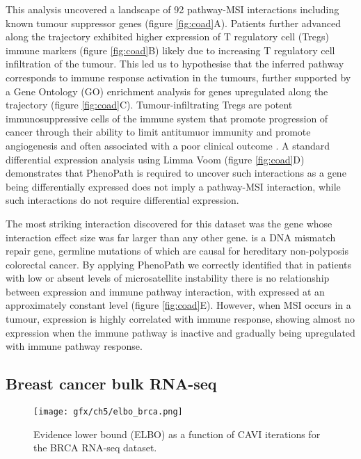 This analysis uncovered a landscape of 92 pathway-MSI interactions including known tumour suppressor genes (figure \ref{fig:coad}A).
Patients further advanced along the trajectory exhibited higher expression of T regulatory cell (Tregs) immune markers (figure \ref{fig:coad}B) likely due to increasing T regulatory cell infiltration of the tumour.
This led us to hypothesise that the inferred pathway corresponds to immune response activation in the tumours, further supported by a Gene Ontology (GO) enrichment analysis for genes upregulated along the trajectory   (figure \ref{fig:coad}C).
Tumour-infiltrating Tregs are potent immunosuppressive cells of the immune system that promote progression of cancer through their ability to limit antitumuor immunity and promote angiogenesis and often associated with a poor clinical outcome \cite{facciabene2012t}.
A standard differential expression analysis using Limma Voom \cite{Law2014-tu} (figure \ref{fig:coad}D) demonstrates that PhenoPath is required to uncover such interactions as a gene being differentially expressed does not imply a pathway-MSI interaction, while such interactions do not require differential expression.

The most striking interaction discovered for this dataset was the \mlh gene whose interaction effect size was far larger than any other gene.
\mlh is a DNA mismatch repair gene, germline mutations of which are causal for hereditary non-polyposis colorectal cancer\cite{Bonadona2011-ml,Gille2002-rx}.  By applying PhenoPath we correctly identified that in patients with low or absent levels of microsatellite instability there is no relationship between \mlh expression and immune pathway interaction, with \mlh expressed at an approximately constant level (figure \ref{fig:coad}E). However, when MSI occurs in a tumour, \mlh expression is highly correlated with immune response, showing almost no expression when the immune pathway is inactive and gradually being upregulated with immune pathway response\cite{michel2008high}.

\subsection{Breast cancer bulk RNA-seq} \label{sec:brca}

\begin{figure}
\centering
\texttt{[image: gfx/ch5/elbo\_brca.png]}
\caption{Evidence lower bound (ELBO) as a function of CAVI iterations for the BRCA RNA-seq dataset.}\label{fig:elbo_brca}
\end{figure}

